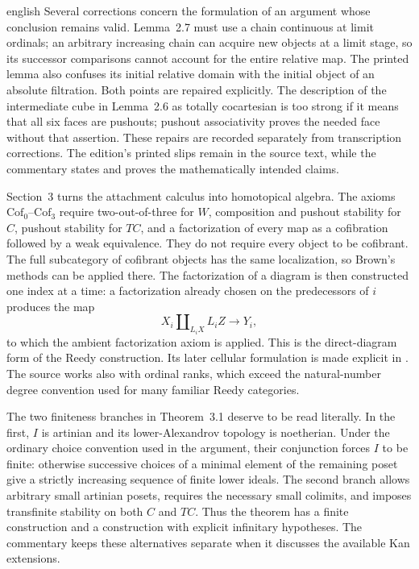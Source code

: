 \begin{otherlanguage*}{english}
Several corrections concern the formulation of an argument whose conclusion remains valid. Lemma~2.7 must use a chain continuous at limit ordinals; an arbitrary increasing chain can acquire new objects at a limit stage, so its successor comparisons cannot account for the entire relative map. The printed lemma also confuses its initial relative domain with the initial object of an absolute filtration. Both points are repaired explicitly. The description of the intermediate cube in Lemma~2.6 as totally cocartesian is too strong if it means that all six faces are pushouts; pushout associativity proves the needed face without that assertion. These repairs are recorded separately from transcription corrections. The edition's printed slips remain in the source text, while the commentary states and proves the mathematically intended claims.

Section~3 turns the attachment calculus into homotopical algebra. The axioms $\mathrm{Cof}_0$--$\mathrm{Cof}_3$ require two-out-of-three for $W$, composition and pushout stability for $C$, pushout stability for $TC$, and a factorization of every map as a cofibration followed by a weak equivalence. They do not require every object to be cofibrant. The full subcategory of cofibrant objects has the same localization, so Brown's methods can be applied there. The factorization of a diagram is then constructed one index at a time: a factorization already chosen on the predecessors of $i$ produces the map
\[
 X_i\amalg_{L_iX}L_iZ\longrightarrow Y_i,
\]
to which the ambient factorization axiom is applied. This is the direct-diagram form of the Reedy construction. Its later cellular formulation is made explicit in \citet[Proposition~6.3 and Lemma~7.1]{RiehlVerity2014Reedy}. The source works also with ordinal ranks, which exceed the natural-number degree convention used for many familiar Reedy categories.

The two finiteness branches in Theorem~3.1 deserve to be read literally. In the first, $I$ is artinian and its lower-Alexandrov topology is noetherian. Under the ordinary choice convention used in the argument, their conjunction forces $I$ to be finite: otherwise successive choices of a minimal element of the remaining poset give a strictly increasing sequence of finite lower ideals. The second branch allows arbitrary small artinian posets, requires the necessary small colimits, and imposes transfinite stability on both $C$ and $TC$. Thus the theorem has a finite construction and a construction with explicit infinitary hypotheses. The commentary keeps these alternatives separate when it discusses the available Kan extensions.


\end{otherlanguage*}
